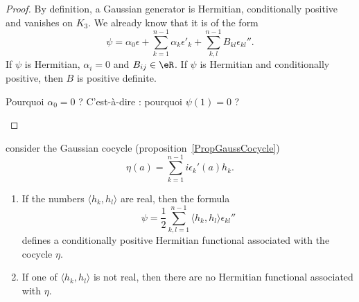 \begin{proof}
	By definition, a Gaussian generator is Hermitian, conditionally positive and vanishes on $K_3$. We already know that it is of the form
	\begin{equation}        \label{EqFormgenpsiGauss}
		\psi=\alpha_0\epsilon+\sum_{k=1}^{n-1}\alpha_k\epsilon'_k+\sum_{k,l}^{n-1}B_{kl}\epsilon_{kl}''.
	\end{equation}
	If $\psi$ is Hermitian, $\alpha_i=0$ and $B_{ij}\in \eR$. If $\psi$ is Hermitian and conditionally positive, then $B$ is positive definite.

	\begin{probleme}
		Pourquoi $\alpha_0=0$ ? C'est-à-dire : pourquoi $\psi(1)=0$ ?
	\end{probleme}

\end{proof}

\begin{proposition}
	consider the Gaussian cocycle (proposition~\ref{PropGaussCocycle})
	\begin{equation}
		\eta(a)=\sum_{k=1}^{n-1}i\epsilon_k'(a)h_k.
	\end{equation}
	\begin{enumerate}
		\item
		      If the numbers $\langle h_k, h_l\rangle $ are real, then the formula
		      \begin{equation}
			      \psi=\frac{ 1 }{2}\sum_{k,l=1}^{n-1}\langle h_k, h_l\rangle \epsilon_{kl}''
		      \end{equation}
		      defines a conditionally positive Hermitian functional associated with the cocycle $\eta$.

		\item
		      If one of $\langle h_k, h_l\rangle $ is not real, then there are no Hermitian functional associated with $\eta$.
	\end{enumerate}

\end{proposition}

